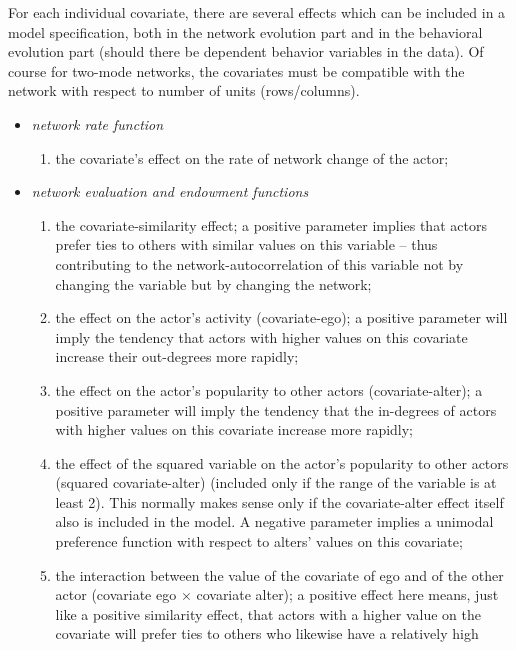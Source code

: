 \documentclass[a4paper,fleqn]{article}
\newcommand{\+}{\, + \,}
\begin{document}
{For each individual covariate, there are several effects which
can be included in a model specification, both in the network
evolution part and in the behavioral evolution part (should there be
dependent behavior variables in the data).
Of course for two-mode networks, the covariates must be compatible
with the network with respect to number of units (rows/columns).
\begin{itemize}
\item {\em network rate function}
\begin{enumerate}
\item the covariate's effect on the rate of network change of the
actor;
\end{enumerate}
\item {\em network evaluation and endowment functions}
\begin{enumerate}
\item the covariate-similarity effect;
      a positive parameter implies that actors prefer
      ties to others with similar values on this variable --
      thus contributing to the
      network-autocorrelation of this variable not by changing
      the variable but by changing the network;
\item the effect on the actor's activity (covariate-ego);
      a positive parameter will imply the tendency that
      actors with higher values on this covariate
      increase their out-degrees more rapidly;
\item the effect on the actor's popularity to other actors (covariate-alter);
      a positive parameter will imply the tendency that
      the in-degrees of actors with higher values on this covariate
      increase more rapidly;
\item the effect of the squared variable
      on the actor's popularity to other actors (squared covariate-alter)
      (included only if the range of the variable is at least 2).
      This normally makes sense only if the covariate-alter effect
      itself also is included in the model.
      A negative parameter implies a unimodal preference
      function with respect to alters' values on this covariate;
\item the interaction between the value of the covariate
      of ego and of the other actor (covariate ego $\times$ covariate alter);
      a positive effect here means, just like a positive similarity effect,
      that actors with a higher value on the covariate
      will prefer ties to others who likewise have a relatively high

\end{enumerate}
\end{itemize}}
\end{document}
